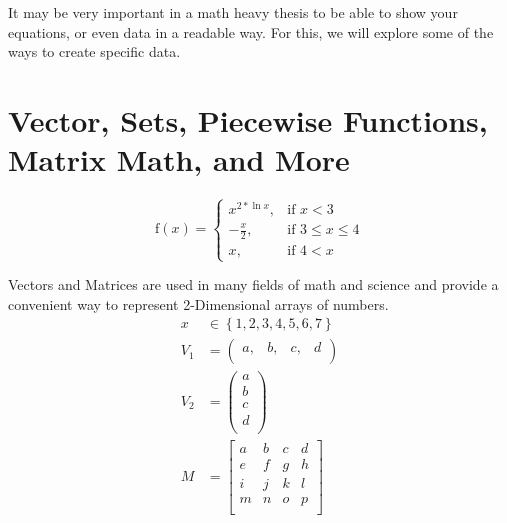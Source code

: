 	It may be very important in a math heavy thesis to be able to show your equations, or even data in a readable way. For this, we will explore some of the ways to create specific data.

	\section{Vector, Sets, Piecewise Functions, Matrix Math, and More}
		\begin{equation}
			\text{f}(x) = 
				\begin{cases}
					x^{2*\ln{x}},&\text{if }x<3\\
					-\frac{x}{2},&\text{if }3\leq{}x\leq{}4\\
					x,&\text{if }4<x
				\end{cases}
		\end{equation}
	
		Vectors and Matrices are used in many fields of math and science and provide a convenient way to represent 2-Dimensional arrays of numbers.
		\begin{align}
			x&\in{}\left\{1,2,3,4,5,6,7\right\}\\
			V_{1} &= {\left(
			\begin{array}{cccc}
				a, & b, & c, & d\\
			\end{array}
			\right)}\\
			V_{2} &= \left(
			\begin{array}{c}
				a \\
				b \\
				c \\
				d \\
			\end{array}
			\right)\\
			M &= {\left[
			\begin{array}{cccc}
				a & b & c & d\\
				e & f & g & h\\
				i & j & k & l\\
				m & n & o & p\\
			\end{array}
			\right]}
		\end{align}